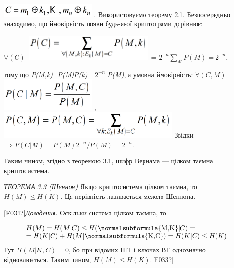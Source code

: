  \includegraphics[width=1.8819in,height=0.2791in]{crypt-img/crypt-img34.png} . 
Використовуємо теорему 2.1. Безпосередньо знаходимо, що ймовірність появи
будь-якої криптограми дорівнює:

{\centering
 ${\forall (C)}$  
\includegraphics[width=2.5984in,height=0.5189in]{crypt-img/crypt-img35.png} =
${2^{{-n}}\underset{{M}}{\sum }{P(M)}=2^{{-n}}}$,
\par}

{\centering
тому що
\textit{P}\textit{(}\textit{M}\textit{,}\textit{k}\textit{)=}\textit{P}\textit{(}\textit{M}\textit{)}\textit{P}\textit{(}\textit{k}\textit{)=}
${2^{{-n}}}$ \textit{P}\textit{(}\textit{M}\textit{)},  а  умовна ймовірність: 
${\forall (C,M)}$  
\includegraphics[width=1.8862in,height=0.661in]{crypt-img/crypt-img36.png} ,  
\includegraphics[width=3.602in,height=0.539in]{crypt-img/crypt-img37.png} 
Звідки  ${\Rightarrow P(C|M)=P(M)2^{{-n}}/P(M)=2^{{-n}}}$. 
\par}

Таким чином, згідно з теоремою 3.1, шифр Вернама --- цілком таємна криптосистема.


\bigskip

\textit{ТЕОРЕМА }\textit{3}\textit{.3 (Шеннон)} Якщо криптосистема цілком
таємна, то  ${H(M)\le H(K)}$. Ця нерівність називається межею Шеннона.

\textlatin{[F034?]}\textit{Доведення.} Оскільки система цілком таємна, то 

\begin{equation*}
\begin{matrix}{H(M)=H(M|C)\le H(\normalsubformula{\text{M,K}}|C)=}\hfill\null
\\{=H(K|C)+H(M|\normalsubformula{\text{K,C}})=H(K|C)\le H({K})}\hfill\null
\end{matrix}\hfill 
\end{equation*}
Тут   ${H(M|K,C)=0}$, бо при відомих ШТ і  ключах ВТ однозначно відновлюється. 
Таким чином,   ${H(M)\le H(K)}$.\textlatin{[F033?]}

